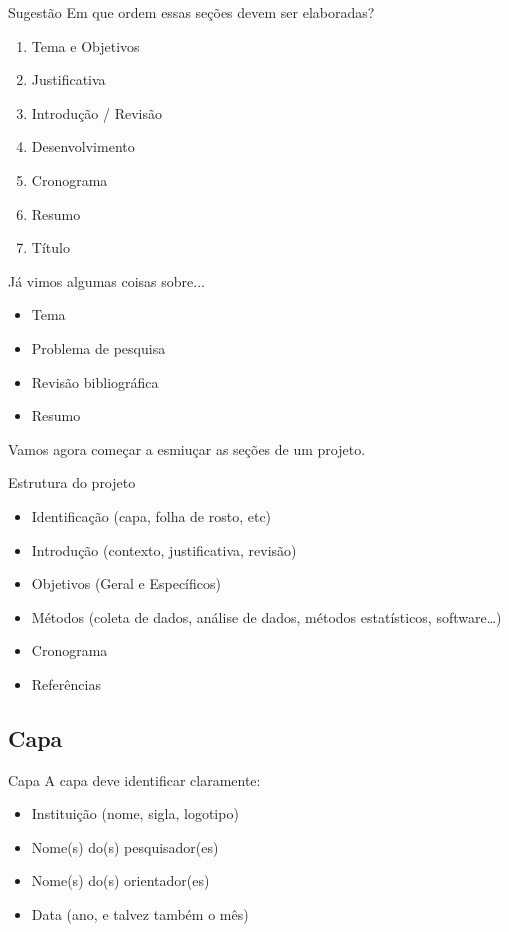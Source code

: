 \documentclass{beamer}
\begin{document}
\begin{frame}{Sugestão}
Em que ordem essas seções devem ser elaboradas?
\begin{enumerate}
\item Tema e Objetivos
\item Justificativa
\item Introdução / Revisão
\item Desenvolvimento
\item Cronograma
\item Resumo
\item Título
\end{enumerate}
\end{frame}

\begin{frame}{Já vimos algumas coisas sobre...}
  \begin{itemize}
  \item<1-> Tema
  \item<1-> Problema de pesquisa
  \item<1-> Revisão bibliográfica
  \item<1-> Resumo
  \end{itemize}

  Vamos agora começar a esmiuçar as seções de um projeto.
\end{frame}

\begin{frame}{Estrutura do projeto}
  \begin{itemize}
  \item<1-> Identificação (capa, folha de rosto, etc)
  \item<1-> Introdução (contexto, justificativa, revisão)
  \item<1-> Objetivos (Geral e Específicos)
  \item<1-> Métodos (coleta de dados, análise de dados, métodos estatísticos, software\ldots)
  \item<1-> Cronograma
  \item<1-> Referências
  \end{itemize}
\end{frame}

\subsection{Capa}

\begin{frame}{Capa}
A capa deve identificar claramente:
  \begin{itemize}
  \item Instituição (nome, sigla, logotipo)
  \item Nome(s) do(s) pesquisador(es)
  \item Nome(s) do(s) orientador(es)
  \item Data (ano, e talvez também o mês)
  \end{itemize}
\end{frame}
\end{document}

